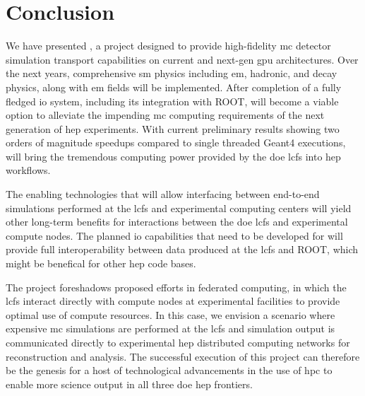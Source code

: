 \section{Conclusion}

We have presented \celeritas, a project designed to provide high-fidelity
\ac{mc} detector simulation transport capabilities on current and next-gen
\ac{gpu} architectures. Over the next years, comprehensive \ac{sm} physics
including \ac{em}, hadronic, and decay physics, along with \ac{em} fields will
be implemented. After completion of a fully fledged \ac{io} system, including
its integration with ROOT, \celeritas will become a viable option to alleviate
the impending \ac{mc} computing requirements of the next generation of \ac{hep}
experiments. {\color{red}With current preliminary results showing two orders of
magnitude speedups compared to single threaded Geant4 executions}, \celeritas
will bring the tremendous computing power provided by the \ac{doe} \acp{lcf}
into \ac{hep} workflows.

The enabling technologies that will allow interfacing between end-to-end
simulations performed at the \acp{lcf} and experimental computing centers will
yield other long-term benefits for interactions between the \ac{doe} \acp{lcf}
and experimental compute nodes. The planned \ac{io} capabilities that need to be
developed for \celeritas will provide full interoperability between data
produced at the \acp{lcf} and ROOT, which might be benefical for other \ac{hep}
code bases.

The \celeritas project foreshadows proposed efforts in federated computing, in
which the \acp{lcf} interact directly with compute nodes at experimental
facilities to provide optimal use of compute resources.  In this case, we
envision a scenario where expensive \ac{mc} simulations are performed at the
\acp{lcf} and simulation output is communicated directly to experimental
\ac{hep} distributed computing networks for reconstruction and analysis.  The
successful execution of this project can therefore be the genesis for a host of
technological advancements in the use of \ac{hpc} to enable more science output
in all three \ac{doe} \ac{hep} frontiers.

